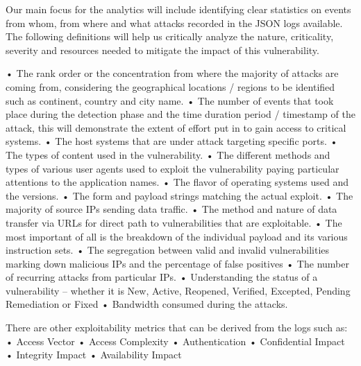 Our main focus for the analytics will include identifying clear statistics on events from whom, from where and what attacks recorded in the JSON logs available. The following definitions will help us critically analyze the nature, criticality, severity and resources needed to mitigate the impact of this vulnerability.

•	The rank order or the concentration from where the majority of attacks are coming from, considering the geographical locations / regions to be identified such as continent, country and city name. %
•	The number of events that took place during the detection phase and the time duration period / timestamp of the attack, this will demonstrate the extent of effort put in to gain access to critical systems. %
•	The host systems that are under attack targeting specific ports.%
•	The types of content used in the vulnerability. %
•	The different methods and types of various user agents used to exploit the vulnerability paying particular attentions to the application names.%
•	The flavor of operating systems used and the versions. %
•	The form and payload strings matching the actual exploit. %
•	The majority of source IPs sending data traffic. %
•	The method and nature of data transfer via URLs for direct path to vulnerabilities that are exploitable. %
•	The most important of all is the breakdown of the individual payload and its various instruction sets. %
•	The segregation between valid and invalid vulnerabilities marking down malicious IPs and the percentage of false positives %
•	The number of recurring attacks from particular IPs. %
•	Understanding the status of a vulnerability – whether it is New, Active, Reopened, Verified, Excepted, Pending Remediation or Fixed %
•	Bandwidth consumed during the attacks.  %

There are other exploitability metrics that can be derived from the logs such as:
•	Access Vector %
•	Access Complexity %
•	Authentication %
•	Confidential Impact %
•	Integrity Impact %
•	Availability Impact
